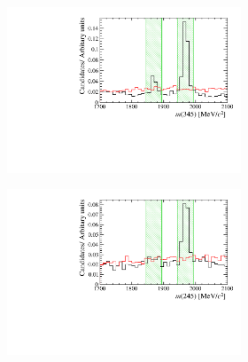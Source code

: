 \begin{figure}[!h]
\begin{subfigure}[t]{1.0\textwidth}
\begin{subfigure}[t]{0.32\textwidth}
         \includegraphics[width=1.0\textwidth]{figs/Selection/Veto_Comparison_B2DsPhi_Ds2PiPiPi_m345.pdf}
      \end{subfigure}
      \caption{\decay{\Bp}{(\decay{\Dsp}{\pip\pim\pip})\phiz}}
   \end{subfigure}
   \begin{subfigure}[t]{1.0\textwidth}
      \centering
      \begin{subfigure}[t]{0.32\textwidth}
         \includegraphics[width=1.0\textwidth]{figs/Selection/Veto_Comparison_B2DsPhi_Ds2KPiPi_m245.pdf}
      \end{subfigure}
      \begin{subfigure}[t]{0.32\textwidth}

\end{subfigure}
\end{subfigure}
\end{figure}

